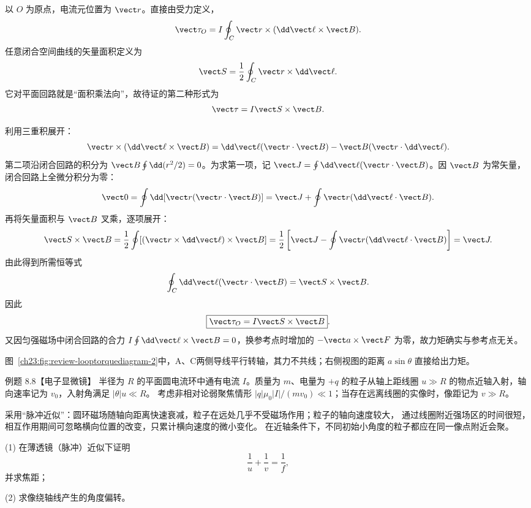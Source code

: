 \begin{xesolution}
以 $O$ 为原点，电流元位置为 $\vect r$。直接由受力定义，
\begin{equation}
  \vect\tau_O=I\oint_C\vect r\times
  (\dd\vect\ell\times\vect B).
\end{equation}
任意闭合空间曲线的矢量面积定义为
\begin{equation}
  \vect S=\frac12\oint_C\vect r\times\dd\vect\ell.
\end{equation}
它对平面回路就是“面积乘法向”，故待证的第二种形式为
\[
  \vect\tau=I\vect S\times\vect B.
\]

利用三重积展开：
\[
  \vect r\times(\dd\vect\ell\times\vect B)
  =\dd\vect\ell(\vect r\cdot\vect B)
  -\vect B(\vect r\cdot\dd\vect\ell).
\]
第二项沿闭合回路的积分为
$\vect B\oint\dd(r^2/2)=0$。为求第一项，记
$\vect J=\oint\dd\vect\ell(\vect r\cdot\vect B)$。因 $\vect B$ 为常矢量，闭合回路上全微分积分为零：
\[
  \vect0=\oint\dd[\vect r(\vect r\cdot\vect B)]
  =\vect J+\oint\vect r(\dd\vect\ell\cdot\vect B).
\]
再将矢量面积与 $\vect B$ 叉乘，逐项展开：
\[
  \vect S\times\vect B
  =\frac12\oint[(\vect r\times\dd\vect\ell)\times\vect B]
  =\frac12\left[\vect J-\oint\vect r(\dd\vect\ell\cdot\vect B)\right]
  =\vect J.
\]
由此得到所需恒等式
\[
  \oint_C\dd\vect\ell(\vect r\cdot\vect B)=\vect S\times\vect B.
\]
因此
\begin{equation}
  \boxed{\vect\tau_O=I\vect S\times\vect B}.
\end{equation}
又因匀强磁场中闭合回路的合力
$I\oint\dd\vect\ell\times\vect B=0$，换参考点时增加的
$-\vect a\times\vect F$ 为零，故力矩确实与参考点无关。

图~\ref{ch23:fig:review-looptorquediagram-2}中，A、C两侧导线平行转轴，其力不共线；右侧视图的距离 $a\sin\theta$ 直接给出力矩。
\par\noindent\begin{minipage}{\linewidth}
\loopTorqueDiagram
{}\label{ch23:fig:review-looptorquediagram-2}
\end{minipage}\par\medskip
\end{xesolution}

\begin{origexamplebox}{例题 8.8【电子显微镜】}
半径为 $R$ 的平面圆电流环中通有电流 $I$。质量为 $m$、电量为 $+q$ 的粒子从轴上距线圈
$u\gg R$ 的物点近轴入射，轴向速率记为 $v_0$，入射角满足 $|\theta|u\ll R$。
考虑非相对论弱聚焦情形 $|q|\mu_0|I|/(mv_0)\ll1$；当存在远离线圈的实像时，像距记为 $v\gg R$。

采用“脉冲近似”：圆环磁场随轴向距离快速衰减，粒子在远处几乎不受磁场作用；粒子的轴向速度较大，
通过线圈附近强场区的时间很短，相互作用期间可忽略横向位置的改变，只累计横向速度的微小变化。
在近轴条件下，不同初始小角度的粒子都应在同一像点附近会聚。

(1) 在薄透镜（脉冲）近似下证明
\[
  \frac1u+\frac1v=\frac1f,
\]
并求焦距；

(2) 求像绕轴线产生的角度偏转。
\end{origexamplebox}

